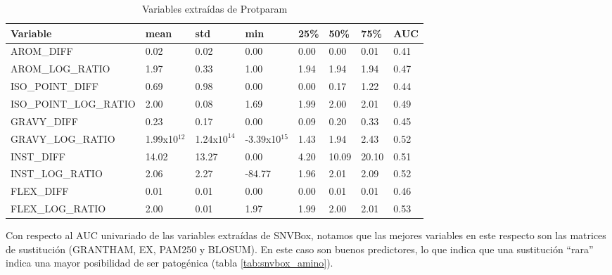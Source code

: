 \begin{table}[H]
\centering
\begin{tabular}{|l|l|l|l|l|l|l|l|}
\hline
Variable & mean & std & min & 25\% & 50\%  & 75\%  & AUC \\ \hline
AROM\_DIFF  & 0.02  & 0.02  & 0.00 & 0.00 & 0.00  & 0.01  & 0.41 \\ \hline
AROM\_LOG\_RATIO & 1.97 & 0.33 & 1.00 & 1.94 & 1.94  & 1.94  & 0.47 \\ \hline
ISO\_POINT\_DIFF & 0.69  & 0.98 & 0.00  & 0.00 & 0.17  & 1.22  & 0.44 \\ \hline
ISO\_POINT\_LOG\_RATIO & 2.00 & 0.08 & 1.69 & 1.99 & 2.00  & 2.01  & 0.49 \\ \hline
GRAVY\_DIFF & 0.23 & 0.17 & 0.00 & 0.09 & 0.20  & 0.33  & 0.45 \\ \hline
GRAVY\_LOG\_RATIO & 1.99x10$^{12}$ & 1.24x$10^{14}$ & -3.39x10$^{15}$ & 1.43 & 1.94 & 2.43 & 0.52 \\\hline
INST\_DIFF & 14.02 & 13.27 & 0.00 & 4.20 & 10.09 & 20.10 & 0.51 \\ \hline
INST\_LOG\_RATIO & 2.06 & 2.27 & -84.77 & 1.96 & 2.01  & 2.09  & 0.52 \\ \hline
FLEX\_DIFF & 0.01 & 0.01 & 0.00 & 0.00 & 0.01  & 0.01  & 0.46 \\ \hline
FLEX\_LOG\_RATIO & 2.00 & 0.01 & 1.97 & 1.99 & 2.00  & 2.01  & 0.53 \\ \hline
\end{tabular}
\caption{Variables extraídas de Protparam}
\label{tab:protparam_vars}
\end{table}

\newpage

Con respecto al AUC univariado de las variables extraídas de SNVBox, notamos que las mejores variables en este respecto son las matrices de sustitución (GRANTHAM, EX, PAM250 y BLOSUM). En este caso son buenos predictores, lo que indica que una sustitución ``rara'' indica una mayor posibilidad de ser patogénica (tabla \ref{tab:snvbox_amino}). 



